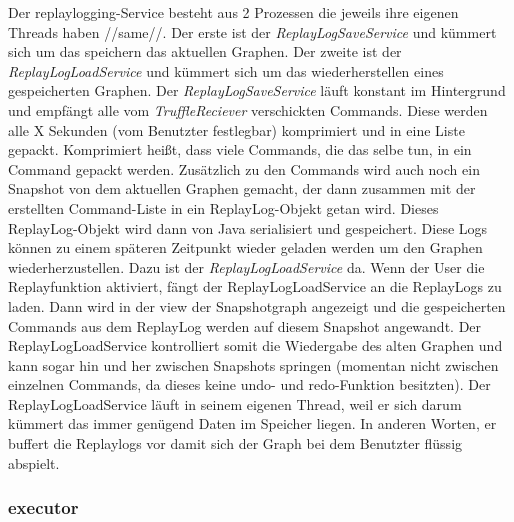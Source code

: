    \medskip
    Der replaylogging-Service besteht aus 2 Prozessen die jeweils ihre eigenen Threads haben        //same//.
    Der erste ist der \textit{ReplayLogSaveService} und kümmert sich um das speichern das aktuellen
    Graphen. Der zweite ist der \textit{ReplayLogLoadService} und kümmert sich um das
    wiederherstellen eines gespeicherten Graphen.
    \newline
    \newline
    Der \textit{ReplayLogSaveService} läuft konstant im Hintergrund und empfängt alle
    vom \textit{TruffleReciever} verschickten Commands. Diese werden alle X
    Sekunden (vom Benutzter festlegbar) komprimiert und in eine Liste gepackt.
    Komprimiert heißt, dass viele Commands, die das selbe tun, in ein Command
    gepackt werden. Zusätzlich zu den Commands wird auch noch ein Snapshot
    von dem aktuellen Graphen gemacht, der dann zusammen mit der erstellten
    Command-Liste in ein ReplayLog-Objekt getan wird. Dieses
    ReplayLog-Objekt wird dann von Java serialisiert und gespeichert.
    \newline
    \newline
    Diese Logs können zu einem späteren Zeitpunkt wieder geladen werden um den
    Graphen wiederherzustellen. Dazu ist der \textit{ReplayLogLoadService} da. Wenn
    der User die Replayfunktion aktiviert, fängt der ReplayLogLoadService an die
    ReplayLogs zu laden. Dann wird in der view der Snapshotgraph angezeigt
    und die gespeicherten Commands aus dem ReplayLog werden auf
    diesem Snapshot angewandt. Der ReplayLogLoadService kontrolliert somit die
    Wiedergabe des alten Graphen und kann sogar hin und her zwischen Snapshots
    springen (momentan nicht zwischen einzelnen Commands, da dieses keine undo-
    und redo-Funktion besitzten).
    \newline
    \newline
    Der ReplayLogLoadService läuft in seinem eigenen Thread, weil er sich darum
    kümmert das immer genügend Daten im Speicher liegen. In anderen Worten, er
    buffert die Replaylogs vor damit sich der Graph bei dem Benutzter flüssig
    abspielt.

    \subsubsection{executor}
    \label{subsubsec:executor}

